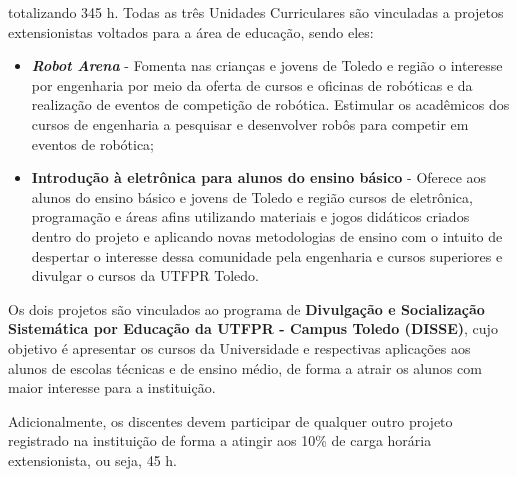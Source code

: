 \noindent totalizando 345 h. Todas as três Unidades Curriculares são vinculadas a projetos extensionistas voltados para a área de educação, sendo eles:

\begin{itemize}
    \item \textbf{\textit{Robot Arena}} - Fomenta nas crianças e jovens de Toledo e região o interesse por engenharia por meio da oferta de cursos e oficinas de robóticas e da realização de eventos de competição de robótica. Estimular os acadêmicos dos cursos de engenharia a pesquisar e desenvolver robôs para competir em eventos de robótica;
    \item \textbf{Introdução à eletrônica para alunos do ensino básico} - Oferece aos alunos do ensino básico e jovens de Toledo e região cursos de eletrônica, programação e áreas afins utilizando materiais e jogos didáticos criados dentro do projeto e aplicando novas metodologias de ensino com o intuito de despertar o interesse dessa comunidade pela engenharia e cursos superiores e divulgar o cursos da UTFPR Toledo.
\end{itemize}

Os dois projetos são vinculados ao programa de \textbf{Divulgação e Socialização Sistemática por Educação da UTFPR - Campus Toledo (DISSE)}, cujo objetivo é apresentar os cursos da Universidade e respectivas aplicações aos alunos de escolas técnicas e de ensino médio, de forma a atrair os alunos com maior interesse para a instituição.


Adicionalmente, os discentes devem participar de qualquer outro projeto registrado na instituição de forma a atingir aos 10\% de carga horária extensionista, ou seja, 45 h. 